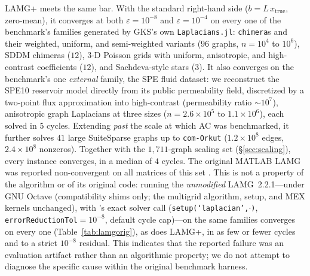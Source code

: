\documentclass{siamart220329}
\begin{document}
LAMG+ meets the same bar. With the standard right-hand side ($b=L\,x_{\mathrm{true}}$, zero-mean), it
converges at both $\varepsilon=10^{-8}$ and $\varepsilon=10^{-4}$ on every one of the benchmark's families generated by
GKS's own \texttt{Laplacians.jl}: \texttt{chimera}s and their weighted, uniform, and
semi-weighted variants ($96$ graphs, $n=10^4$ to $10^6$), SDDM chimeras ($12$), $3$-D Poisson grids
with uniform, anisotropic, and high-contrast coefficients ($12$), and Sachdeva-style stars ($3$). It
also converges on the benchmark's one \emph{external} family, the SPE fluid dataset: we reconstruct
the SPE10 reservoir model \cite{christie-blunt} directly from its public permeability field,
discretized by a two-point flux approximation into high-contrast (permeability ratio ${\sim}10^7$),
anisotropic graph Laplacians at three sizes ($n=2.6\times10^5$ to $1.1\times10^6$), each solved in
$5$ cycles. Extending \emph{past} the scale at which AC was benchmarked, it further solves $41$ large
SuiteSparse graphs up to \texttt{com-Orkut} ($1.2\times10^8$ edges, $2.4\times10^8$ nonzeros).
Together with the $1{,}711$-graph scaling set (\S\ref{sec:scaling}), every instance converges, in a
median of $4$ cycles. The original MATLAB LAMG was reported non-convergent on all matrices of this set
\cite{gks2023}. This is not a property of the algorithm or of its original code: running the
\emph{unmodified} LAMG~2.2.1---under GNU Octave (compatibility shims only; the multigrid algorithm,
setup, and MEX kernels unchanged), with \cite{gks2023}'s exact solver call
(\texttt{setup(`laplacian',$\cdot$)}, \texttt{errorReductionTol}$=10^{-8}$, default cycle cap)---on the
same families converges on every one (Table~\ref{tab:lamgorig}), as does
LAMG+, in as few or fewer cycles and to a strict $10^{-8}$ residual. This indicates that the reported failure was an evaluation artifact rather than an algorithmic
property; we do not attempt to diagnose the specific cause within the original benchmark harness.
\end{document}
